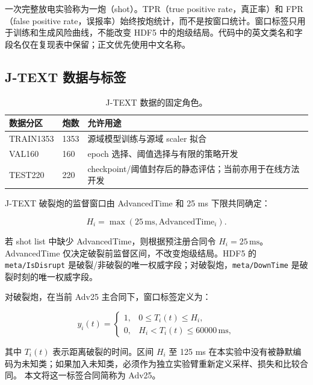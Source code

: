 \documentclass[11pt,a4paper]{article}
\newcommand{\code}[1]{\texttt{\small #1}}
\begin{document}
一次完整放电实验称为一炮（shot）。TPR（true positive rate，真正率）和 FPR（false positive rate，误报率）始终按炮统计，而不是按窗口统计。窗口标签只用于训练和生成风险曲线，不能改变 HDF5 中的炮级结局。代码中的英文类名和字段名仅在复现表中保留；正文优先使用中文名称。

\subsection{J-TEXT 数据与标签}

\begin{table}[H]
\centering
\caption{J-TEXT 数据的固定角色。}
\begin{tabularx}{\textwidth}{l C{19mm} Y}
\toprule
数据分区 & 炮数 & 允许用途\\
\midrule
TRAIN1353 & 1353 & 源域模型训练与源域 scaler 拟合\\
VAL160 & 160 & epoch 选择、阈值选择与有限的策略开发\\
TEST220 & 220 & checkpoint/阈值封存后的静态评估；当前亦用于在线方法开发\\
\bottomrule
\end{tabularx}
\end{table}

J-TEXT 破裂炮的监督窗口由 AdvancedTime 和 25 ms 下限共同确定：

\begin{equation}
H_i=\max\left(25\,\mathrm{ms},\mathrm{AdvancedTime}_i\right).
\label{eq:jtext-horizon}
\end{equation}

若 shot list 中缺少 AdvancedTime，则根据预注册合同令 \(H_i=25\,\mathrm{ms}\)。AdvancedTime 仅决定破裂前监督区间，不改变炮级结局。HDF5 的 \code{meta/IsDisrupt} 是破裂/非破裂的唯一权威字段；对破裂炮，\code{meta/DownTime} 是破裂时刻的唯一权威字段。

对破裂炮，在当前 Adv25 主合同下，窗口标签定义为：

\begin{equation}
y_i(t)=
\begin{cases}
1,&0\leq T_i(t)\leq H_i,\\
0,&H_i<T_i(t)\leq 60000\,\mathrm{ms},
\end{cases}
\label{eq:jtext-label}
\end{equation}

其中 \(T_i(t)\) 表示距离破裂的时间。区间 \(H_i\) 至 125 ms 在本实验中没有被静默编码为未知类；如果加入未知类，必须作为独立实验臂重新定义采样、损失和比较合同。
本文将这一标签合同简称为 Adv25。
\end{document}
